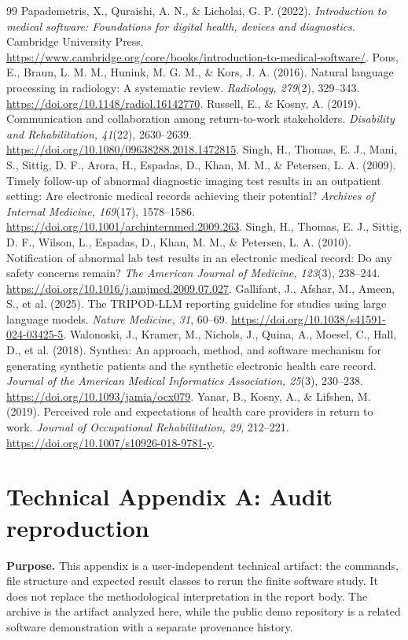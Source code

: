 \documentclass[11pt,twocolumn]{article}
\begin{document}
\begin{thebibliography}{99}
 Papademetris, X., Quraishi, A. N., \& Licholai, G. P. (2022). \emph{Introduction to medical software: Foundations for digital health, devices and diagnostics}. Cambridge University Press. \url{https://www.cambridge.org/core/books/introduction-to-medical-software/}.
 Pons, E., Braun, L. M. M., Hunink, M. G. M., \& Kors, J. A. (2016). Natural language processing in radiology: A systematic review. \emph{Radiology, 279}(2), 329--343. \url{https://doi.org/10.1148/radiol.16142770}.
 Russell, E., \& Kosny, A. (2019). Communication and collaboration among return-to-work stakeholders. \emph{Disability and Rehabilitation, 41}(22), 2630--2639. \url{https://doi.org/10.1080/09638288.2018.1472815}.
 Singh, H., Thomas, E. J., Mani, S., Sittig, D. F., Arora, H., Espadas, D., Khan, M. M., \& Petersen, L. A. (2009). Timely follow-up of abnormal diagnostic imaging test results in an outpatient setting: Are electronic medical records achieving their potential? \emph{Archives of Internal Medicine, 169}(17), 1578--1586. \url{https://doi.org/10.1001/archinternmed.2009.263}.
 Singh, H., Thomas, E. J., Sittig, D. F., Wilson, L., Espadas, D., Khan, M. M., \& Petersen, L. A. (2010). Notification of abnormal lab test results in an electronic medical record: Do any safety concerns remain? \emph{The American Journal of Medicine, 123}(3), 238--244. \url{https://doi.org/10.1016/j.amjmed.2009.07.027}.
 Gallifant, J., Afshar, M., Ameen, S., et al. (2025). The TRIPOD-LLM reporting guideline for studies using large language models. \emph{Nature Medicine, 31}, 60--69. \url{https://doi.org/10.1038/s41591-024-03425-5}.
 Walonoski, J., Kramer, M., Nichols, J., Quina, A., Moesel, C., Hall, D., et al. (2018). Synthea: An approach, method, and software mechanism for generating synthetic patients and the synthetic electronic health care record. \emph{Journal of the American Medical Informatics Association, 25}(3), 230--238. \url{https://doi.org/10.1093/jamia/ocx079}.
 Yanar, B., Kosny, A., \& Lifshen, M. (2019). Perceived role and expectations of health care providers in return to work. \emph{Journal of Occupational Rehabilitation, 29}, 212--221. \url{https://doi.org/10.1007/s10926-018-9781-y}.
\end{thebibliography}
\normalsize
\clearpage
\section*{Technical Appendix A: Audit reproduction}\label{app:a}
\textbf{Purpose.} This appendix is a user-independent technical artifact: the commands, file structure and expected result classes to rerun the finite software study. It does not replace the methodological interpretation in the report body. The archive is the artifact analyzed here, while the public demo repository is a related software demonstration with a separate provenance history.
\end{document}
